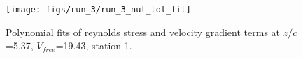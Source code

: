 \begin{figure}[H]
\centering
\texttt{[image: figs/run\_3/run\_3\_nut\_tot\_fit]}
\caption{Polynomial fits of reynolds stress and velocity gradient terms at $z/c$=5.37, $V_{free}$=19.43, station 1.}
\label{fig:run_3_nut_tot_fit}
\end{figure}


